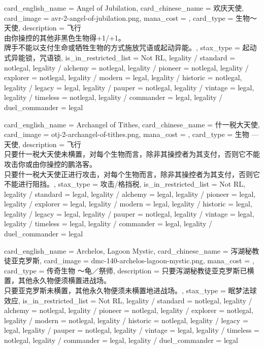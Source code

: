 \documentclass[lang = cn, color = black, 10pt]{AllThatStax}
\begin{document}
\card
{
	card_english_name = {Angel of Jubilation},
	card_chinese_name = {欢庆天使},
	card_image = avr-2-angel-of-jubilation.png,
	mana_cost = ,
	card_type = 生物～天使,
	description = {飞行\\
		由你操控的其他非黑色生物得+1/+1。\\
		牌手不能以支付生命或牺牲生物的方式施放咒语或起动异能。},
	stax_type = 起动式异能锁，咒语锁,
	is_in_restricted_list = Not RL,
	legality / standard = notlegal,
	legality / alchemy = notlegal,
	legality / pioneer = notlegal,
	legality / explorer = notlegal,
	legality / modern = legal,
	legality / historic = notlegal,
	legality / legacy = legal,
	legality / pauper = notlegal,
	legality / vintage = legal,
	legality / timeless = notlegal,
	legality / commander = legal,
	legality / duel_commander = legal
}

\card
{
	card_english_name = {Archangel of Tithes},
	card_chinese_name = {什一税大天使},
	card_image = otj-2-archangel-of-tithes.png,
	mana_cost = ,
	card_type = 生物 — 天使,
	description = {飞行\\
		只要什一税大天使未横置，对每个生物而言，除非其操控者为其支付，否则它不能攻击你或由你操控的鹏洛客。\\
		只要什一税大天使正进行攻击，对每个生物而言，除非其操控者为其支付，否则它不能进行阻挡。},
	stax_type = 攻击/格挡税,
	is_in_restricted_list = Not RL,
	legality / standard = legal,
	legality / alchemy = legal,
	legality / pioneer = legal,
	legality / explorer = legal,
	legality / modern = legal,
	legality / historic = legal,
	legality / legacy = legal,
	legality / pauper = notlegal,
	legality / vintage = legal,
	legality / timeless = legal,
	legality / commander = legal,
	legality / duel_commander = legal
}

\card
{
	card_english_name = {Archelos, Lagoon Mystic},
	card_chinese_name = {泻湖秘教徒亚克罗斯},
	card_image = dmc-140-archelos-lagoon-mystic.png,
	mana_cost = ,
	card_type = 传奇生物 ～龟／祭师,
	description = {只要泻湖秘教徒亚克罗斯已横置，其他永久物便须横置进战场。\\
		只要亚克罗斯未横置，其他永久物便须未横置地进战场。},
	stax_type = 眠梦法球效应,
	is_in_restricted_list = Not RL,
	legality / standard = notlegal,
	legality / alchemy = notlegal,
	legality / pioneer = notlegal,
	legality / explorer = notlegal,
	legality / modern = notlegal,
	legality / historic = notlegal,
	legality / legacy = legal,
	legality / pauper = notlegal,
	legality / vintage = legal,
	legality / timeless = notlegal,
	legality / commander = legal,
	legality / duel_commander = legal
}
\end{document}
